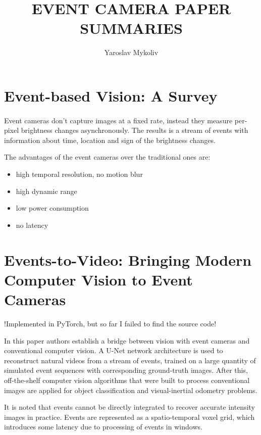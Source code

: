 \documentclass[10pt,a4paper]{article}
\author{Yaroslav Mykoliv}
\title{EVENT CAMERA PAPER SUMMARIES}
\begin{document}
\maketitle

\section{Event-based Vision: A Survey}
\paragraph{}
Event cameras don't capture images at a fixed rate, instead they measure per-pixel brightness changes asynchronously.
The results is a stream of events with information about time, location and sign of the brightness changes.

The advantages of the event cameras over the traditional ones are: 
\begin{itemize}
\item high temporal resolution, no motion blur
\item high dynamic range
\item low power consumption
\item no latency
\end{itemize}
\subsection{}

\section{Events-to-Video: Bringing Modern Computer Vision to Event Cameras}
!Implemented in PyTorch, but so far I failed to find the source code!

In this paper authors establish a bridge between vision with event cameras and conventional computer vision.
A U-Net network architecture is used to reconstruct natural videos from a stream of events, trained on a large quantity of simulated event sequences with corresponding ground-truth images.
After this, off-the-shelf computer vision algorithms that were built to process conventional images are applied for object classification and visual-inertial odometry problems.

It is noted that events cannot be directly integrated to recover accurate intensity images in practice.
Events are represented as a spatio-temporal voxel grid, which introduces some latency due to processing of events in windows.
\end{document}
